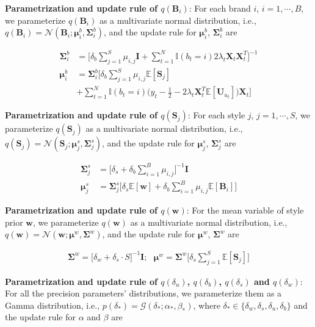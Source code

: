 \noindent \textbf{Parametrization and update rule of $q(\mathbf{B}_i)$}:
For each brand $i$, $i = 1, \cdots, B$, we parameterize $q(\mathbf{B}_i)$ as a multivariate normal distribution, i.e., $q(\mathbf{B}_i) = \mathcal{N}(\mathbf{B}_i; \bm{\mu}^b_i, \bm{\Sigma}^b_i)$, and the update rule for $\bm{\mu}^b_i$, $\bm{\Sigma}^b_i$ are 

\begin{align}
\bm{\Sigma}^b_i & = \Big[\delta_b\sum_{j=1}^S\mu_{i,j}\mathbf{I}+\sum_{t=1}^N\mathbb{I}(b_t=i)2\lambda_{t}\mathbf{X}_t\mathbf{X}_t^T\Big]^{-1} \\ 
\bm{\mu}^b_i & = \bm{\Sigma}_i^b\Big[  \delta_b\sum_{j=1}^S\mu_{i,j}\mathbb{E}[\mathbf{S}_j] \nonumber \\
& + \sum_{t=1}^N\mathbb{I}(b_t=i)\big(y_t-\frac{1}{2}- 2\lambda_{t}\mathbf{X}_t^T\mathbb{E}[\mathbf{U}_{u_t}]\big)\bm{X}_t \Big]
\end{align}


\noindent \textbf{Parametrization and update rule of $q(\mathbf{S}_j)$}:
For each style $j$, $j = 1, \cdots, S$, we parameterize $q(\mathbf{S}_j)$ as a multivariate normal distribution, i.e., $q(\mathbf{S}_j) = \mathcal{N}(\mathbf{S}_j; \bm{\mu}^s_j, \bm{\Sigma}^s_j)$, and the update rule for $\bm{\mu}^s_j$, $\bm{\Sigma}^s_j$ are 

\begin{align}
\bm{\Sigma}^s_j & = \big[\delta_s+\delta_b\sum_{i=1}^{B}\mu_{i,j}\big]^{-1}\mathbf{I} \\ 
\bm{\mu}^s_j & = \bm{\Sigma}_j^{s}\Big[ \delta_s\mathbb{E}[\bm{w}]+\delta_b\sum_{i=1}^B\mu_{i,j}\mathbb{E}[\mathbf{B}_i] \Big]
\end{align}


\noindent \textbf{Parametrization and update rule of $q(\mathbf{w})$}:
For the mean variable of style prior $\mathbf{w}$, we parameterize $q(\mathbf{w})$ as a multivariate normal distribution, i.e., $q(\mathbf{w}) = \mathcal{N}(\mathbf{w}; \bm{\mu}^w, \bm{\Sigma}^w)$, and the update rule for $\bm{\mu}^w$, $\bm{\Sigma}^w$ are 

\begin{align}
\bm{\Sigma}^w  = \big[\delta_w+\delta_s\cdot S\big]^{-1}\mathbf{I};~~~\bm{\mu}^w = \bm{\Sigma}^w\Big[ \delta_s\sum_{j=1}^S\mathbb{E}[\mathbf{S}_j] \Big]
\end{align}



\noindent \textbf{Parametrization and update rule of $q(\delta_u)$, $q(\delta_b)$, $q(\delta_s)$ and $q(\delta_w)$}:
For all the precision parameters' distributions, we parameterize them as a Gamma distribution, i.e., $p(\delta_*) = \mathcal{G}(\delta_*; \alpha_*, \beta_* )$, where $\delta_* \in \{ \delta_w, \delta_s, \delta_u, \delta_b \}$ and the update rule for $\alpha$ and $\beta$ are 

